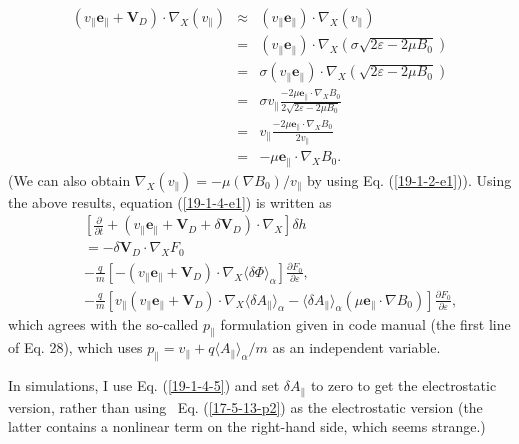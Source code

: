 \documentclass{article}
\newcommand{\tmtexttt}[1]{\text{{\ttfamily{#1}}}}
\begin{document}
\begin{eqnarray}
  (v_{\parallel} \mathbf{e}_{\parallel} +\mathbf{V}_D) \cdot \nabla_X
  (v_{\parallel}) & \approx & (v_{\parallel} \mathbf{e}_{\parallel}) \cdot
  \nabla_X (v_{\parallel}) \nonumber\\
  & = & (v_{\parallel} \mathbf{e}_{\parallel}) \cdot \nabla_X \left( \sigma
  \sqrt{2 \varepsilon - 2 \mu B_0} \right) \nonumber\\
  & = & \sigma (v_{\parallel} \mathbf{e}_{\parallel}) \cdot \nabla_X \left(
  \sqrt{2 \varepsilon - 2 \mu B_0} \right) \nonumber\\
  & = & \sigma v_{\parallel} \frac{- 2 \mu \mathbf{e}_{\parallel} \cdot
  \nabla_X B_0}{2 \sqrt{2 \varepsilon - 2 \mu B_0}} \nonumber\\
  & = & v_{\parallel} \frac{- 2 \mu \mathbf{e}_{\parallel} \cdot \nabla_X
  B_0}{2 v_{\parallel}} \nonumber\\
  & = & - \mu \mathbf{e}_{\parallel} \cdot \nabla_X B_0 . 
\end{eqnarray}
(We can also obtain $\nabla_X (v_{\parallel}) = - \mu (\nabla B_0) /
v_{\parallel}$ by using Eq. (\ref{19-1-2-e1})). Using the above results,
equation (\ref{19-1-4-e1}) is written as
\begin{eqnarray}
  &  & \left[ \frac{\partial}{\partial t} + (v_{\parallel}
  \mathbf{e}_{\parallel} +\mathbf{V}_D + \delta \mathbf{V}_D) \cdot \nabla_X
  \right] \delta h \nonumber\\
  &  & = - \delta \mathbf{V}_D \cdot \nabla_X F_0 \nonumber\\
  &  & - \frac{q}{m} [- (v_{\parallel} \mathbf{e}_{\parallel} +\mathbf{V}_D)
  \cdot \nabla_X \langle \delta \Phi \rangle_{\alpha}] \frac{\partial
  F_0}{\partial \varepsilon}, \nonumber\\
  &  & - \frac{q}{m} [v_{\parallel} (v_{\parallel} \mathbf{e}_{\parallel}
  +\mathbf{V}_D) \cdot \nabla_X \langle \delta A_{\parallel} \rangle_{\alpha}
  - \langle \delta A_{\parallel} \rangle_{\alpha} (\mu \mathbf{e}_{\parallel}
  \cdot \nabla B_0)] \frac{\partial F_0}{\partial \varepsilon}, 
  \label{19-1-4-5}
\end{eqnarray}
which agrees with the so-called $p_{\parallel}$ formulation given in
\tmtexttt{GEM} code manual (the first line of Eq. 28), which uses
$p_{\parallel} = v_{\parallel} + q \langle A_{\parallel} \rangle_{\alpha} / m$
as an independent variable.

In simulations, I use Eq. (\ref{19-1-4-5}) and set $\delta A_{\parallel}$ to
zero to get the electrostatic version, rather than using \ Eq.
(\ref{17-5-13-p2}) as the electrostatic version (the latter contains a
nonlinear term on the right-hand side, which seems strange.)
\end{document}
